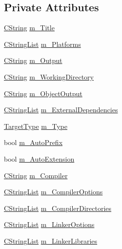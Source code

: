 \subsection*{Private Attributes}
\begin{DoxyCompactItemize}
\item 
\hyperlink{classCString}{C\-String} \hyperlink{classCBuildTarget_abd914af1350302b3cc592cf391d7f4a6}{m\-\_\-\-Title}
\item 
\hyperlink{classCStringList}{C\-String\-List} \hyperlink{classCBuildTarget_ac81df46e239c54c29fb4a19227f863bd}{m\-\_\-\-Platforms}
\item 
\hyperlink{classCString}{C\-String} \hyperlink{classCBuildTarget_a72308b1052dc4d1d0f50869956a0c14a}{m\-\_\-\-Output}
\item 
\hyperlink{classCString}{C\-String} \hyperlink{classCBuildTarget_afbb0bbec05f775062ba32c59560d3e52}{m\-\_\-\-Working\-Directory}
\item 
\hyperlink{classCString}{C\-String} \hyperlink{classCBuildTarget_ae9c897e9a42d93f9f66c704dad17eff1}{m\-\_\-\-Object\-Output}
\item 
\hyperlink{classCStringList}{C\-String\-List} \hyperlink{classCBuildTarget_a00c0dea4b0dd9e34fcfa540c7b8e7ee6}{m\-\_\-\-External\-Dependencies}
\item 
\hyperlink{classCBuildTarget_ae920f5ba8e1975bafff70b8b30c449b5}{Target\-Type} \hyperlink{classCBuildTarget_abdb459bba568451a5e97ff1974ab37d9}{m\-\_\-\-Type}
\item 
bool \hyperlink{classCBuildTarget_aec313b6a7d9f698ab1050fbc0a8b0ebe}{m\-\_\-\-Auto\-Prefix}
\item 
bool \hyperlink{classCBuildTarget_a9f06bf4c3b73ce8bbbab046d819e1046}{m\-\_\-\-Auto\-Extension}
\item 
\hyperlink{classCString}{C\-String} \hyperlink{classCBuildTarget_a130624eb072925fa6e104339f3cef7d3}{m\-\_\-\-Compiler}
\item 
\hyperlink{classCStringList}{C\-String\-List} \hyperlink{classCBuildTarget_a3485b4444afdf7c26edb9139fa7bfa42}{m\-\_\-\-Compiler\-Options}
\item 
\hyperlink{classCStringList}{C\-String\-List} \hyperlink{classCBuildTarget_a290af88d76bcaf78db02e3c3567c8fe8}{m\-\_\-\-Compiler\-Directories}
\item 
\hyperlink{classCStringList}{C\-String\-List} \hyperlink{classCBuildTarget_a7b691145075fb0ab23c4a1f9e26e3000}{m\-\_\-\-Linker\-Options}
\item 
\hyperlink{classCStringList}{C\-String\-List} \hyperlink{classCBuildTarget_abb6557d00a351f4b41841858c55b82f6}{m\-\_\-\-Linker\-Libraries}

\end{DoxyCompactItemize}
